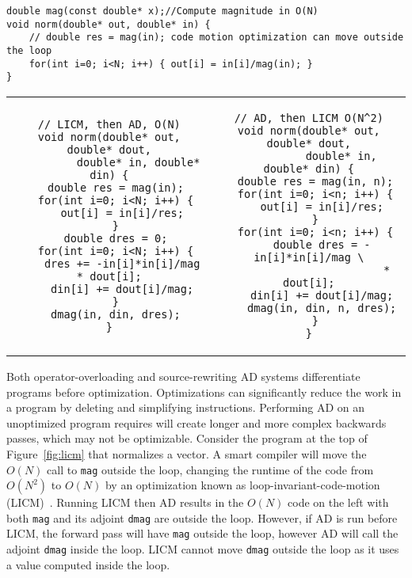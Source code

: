 \begin{figure*}
    \centering
\begin{verbatim}
double mag(const double* x);//Compute magnitude in O(N)
void norm(double* out, double* in) {
    // double res = mag(in); code motion optimization can move outside the loop
    for(int i=0; i<N; i++) { out[i] = in[i]/mag(in); }
}
\end{verbatim}
\begin{tabular}{c|c}
\begin{minipage}[T]{0.49\linewidth}
\begin{verbatim}
// LICM, then AD, O(N)
void norm(double* out, double* dout,
         double* in, double* din) {
  double res = mag(in);
  for(int i=0; i<N; i++) {
    out[i] = in[i]/res;
  }
  double dres = 0;
  for(int i=0; i<N; i++) {
    dres += -in[i]*in[i]/mag * dout[i];
    din[i] += dout[i]/mag;
  }
  dmag(in, din, dres);
}
\end{verbatim}
\end{minipage}& \begin{minipage}[T]{0.49\linewidth}
\begin{verbatim}
// AD, then LICM O(N^2)
void norm(double* out, double* dout,
          double* in, double* din) {
  double res = mag(in, n);
  for(int i=0; i<n; i++) {
    out[i] = in[i]/res;
  }
  for(int i=0; i<n; i++) {
    double dres = -in[i]*in[i]/mag \
                        * dout[i];
    din[i] += dout[i]/mag;
    dmag(in, din, n, dres);
  }
}
\end{verbatim}
\end{minipage}
\end{tabular}
    \caption{In the second program, mag is still able to be moved outside as it is the same every iteration, however, \texttt{dmag} cannot be moved outside the loop as it reads/writes to the same memory.
}
    \label{fig:licm}
\end{figure*}

Both operator-overloading and source-rewriting AD systems differentiate programs before optimization. Optimizations can  significantly reduce the work in a program by deleting and simplifying instructions. Performing AD on an unoptimized program requires will create longer and more complex backwards passes, which may not be optimizable. Consider the program at the top of Figure~\ref{fig:licm} that normalizes a vector. A smart compiler will move the $O(N)$ call to \texttt{mag} outside the loop, changing the runtime of the code from $O(N^2)$ to $O(N)$ by an optimization known as loop-invariant-code-motion (LICM)~\cite[Sec.~13.2]{Muchnick97}. Running LICM then AD results in the $O(N)$ code on the left with both \texttt{mag} and its adjoint \texttt{dmag} are outside the loop. However, if AD is run before LICM, the forward pass will have \texttt{mag} outside the loop, however AD will call the adjoint \texttt{dmag} inside the loop. LICM cannot move \texttt{dmag} outside the loop as it uses a value computed inside the loop.

